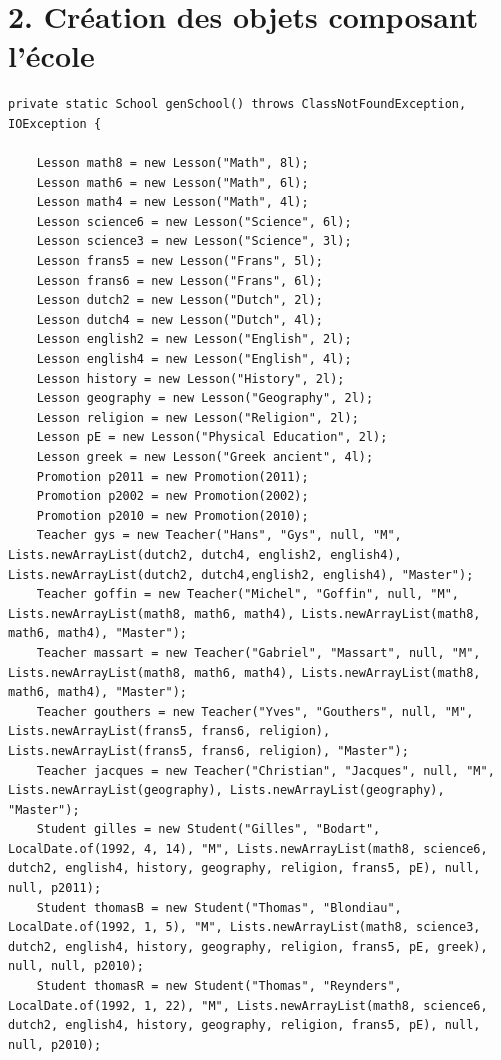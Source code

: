 \documentclass[a4paper,fleqn,12pt,oneside]{book}
\begin{document}
\section*{2. Création des objets composant l'école}

\begin{lstlisting}
private static School genSchool() throws ClassNotFoundException, IOException {

    Lesson math8 = new Lesson("Math", 8l);
    Lesson math6 = new Lesson("Math", 6l);
    Lesson math4 = new Lesson("Math", 4l);
    Lesson science6 = new Lesson("Science", 6l);
    Lesson science3 = new Lesson("Science", 3l);
    Lesson frans5 = new Lesson("Frans", 5l);
    Lesson frans6 = new Lesson("Frans", 6l);
    Lesson dutch2 = new Lesson("Dutch", 2l);
    Lesson dutch4 = new Lesson("Dutch", 4l);
    Lesson english2 = new Lesson("English", 2l);
    Lesson english4 = new Lesson("English", 4l);
    Lesson history = new Lesson("History", 2l);
    Lesson geography = new Lesson("Geography", 2l);
    Lesson religion = new Lesson("Religion", 2l);
    Lesson pE = new Lesson("Physical Education", 2l);
    Lesson greek = new Lesson("Greek ancient", 4l);
    Promotion p2011 = new Promotion(2011);
    Promotion p2002 = new Promotion(2002);
    Promotion p2010 = new Promotion(2010);
    Teacher gys = new Teacher("Hans", "Gys", null, "M", Lists.newArrayList(dutch2, dutch4, english2, english4), Lists.newArrayList(dutch2, dutch4,english2, english4), "Master");
    Teacher goffin = new Teacher("Michel", "Goffin", null, "M", Lists.newArrayList(math8, math6, math4), Lists.newArrayList(math8, math6, math4), "Master");
    Teacher massart = new Teacher("Gabriel", "Massart", null, "M", Lists.newArrayList(math8, math6, math4), Lists.newArrayList(math8, math6, math4), "Master");
    Teacher gouthers = new Teacher("Yves", "Gouthers", null, "M", Lists.newArrayList(frans5, frans6, religion), Lists.newArrayList(frans5, frans6, religion), "Master");
    Teacher jacques = new Teacher("Christian", "Jacques", null, "M", Lists.newArrayList(geography), Lists.newArrayList(geography), "Master");
    Student gilles = new Student("Gilles", "Bodart", LocalDate.of(1992, 4, 14), "M", Lists.newArrayList(math8, science6, dutch2, english4, history, geography, religion, frans5, pE), null, null, p2011);
    Student thomasB = new Student("Thomas", "Blondiau", LocalDate.of(1992, 1, 5), "M", Lists.newArrayList(math8, science3, dutch2, english4, history, geography, religion, frans5, pE, greek), null, null, p2010);
    Student thomasR = new Student("Thomas", "Reynders", LocalDate.of(1992, 1, 22), "M", Lists.newArrayList(math8, science6, dutch2, english4, history, geography, religion, frans5, pE), null, null, p2010);

\end{lstlisting}
\end{document}

